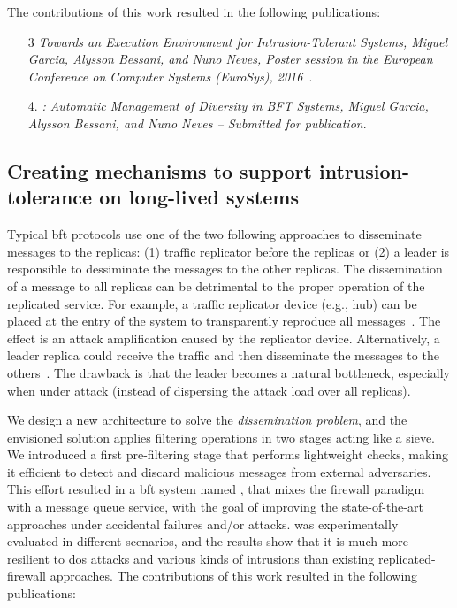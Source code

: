The contributions of this work resulted in the following publications:

\begin{enumerate}

\item[3] \emph{Towards an Execution Environment for Intrusion-Tolerant Systems, Miguel Garcia, Alysson Bessani, and Nuno Neves, Poster session in the European Conference on Computer Systems (EuroSys), 2016}~\cite{Garcia:2016b}.


\item[4.] \emph{\system: Automatic Management of Diversity in BFT Systems, Miguel Garcia, Alysson Bessani, and Nuno Neves -- Submitted for publication}.

\end{enumerate}


\subsection*{Creating mechanisms to support intrusion-tolerance on long-lived systems}

Typical \gls{bft} protocols use one of the two following approaches to disseminate messages to the replicas: (1) traffic replicator before the replicas or (2) a leader is responsible to dessiminate the messages to the other replicas. 
The dissemination of a message to all replicas can be detrimental to the proper operation of the replicated service.
For example, a traffic replicator device (e.g., hub) can be placed at the entry of the system to transparently reproduce all messages~\cite{Sousa:2010,Roeder:2010}. 
The effect is an attack amplification caused by the replicator device.
Alternatively, a leader replica could receive the traffic and then disseminate the messages to the others~\cite{Amir:2011}.
The drawback is that the leader becomes a natural bottleneck, especially when under attack (instead of dispersing the attack load over all replicas).

We design a new architecture to solve the \emph{dissemination problem}, and the envisioned solution applies filtering operations in two stages acting like a sieve.
We introduced a first pre-filtering stage that performs lightweight checks, making it efficient to detect and discard malicious messages from external adversaries.
This effort resulted in a \gls{bft} system named \sieveq, that mixes the firewall paradigm with a message queue service, with the goal of improving the state-of-the-art approaches under accidental failures and/or attacks. 
\sieveq was experimentally evaluated in different scenarios, and the results show that it is much more resilient to \gls{dos} attacks and various kinds of intrusions than existing replicated-firewall approaches.
The contributions of this work resulted in the following publications:

